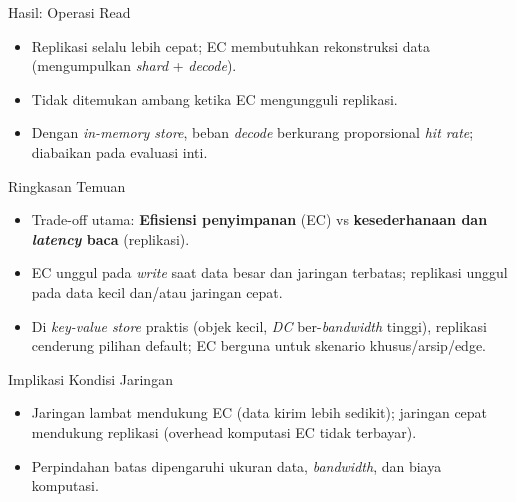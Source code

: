\documentclass[a2,portrait]{config/poster/a0poster}
\newcommand{\postersection}[1]{%
	\begin{tcolorbox}[
		colback=MainBlue,
		colframe=MainBlue,
		fonttitle=\bfseries,
		coltext=white,
		sharp corners,
		boxrule=0pt,
		top=0pt,
		bottom=0pt,
		halign=center
	]
	\normalsize #1
	\end{tcolorbox}%
}
\begin{document}
\begin{multicols}{2}

\postersection{Hasil: Operasi Read}
\begin{itemize}
	\item Replikasi selalu lebih cepat; EC membutuhkan rekonstruksi data (mengumpulkan \textit{shard} + \textit{decode}).
	\item Tidak ditemukan ambang ketika EC mengungguli replikasi.
	\item Dengan \textit{in-memory store}, beban \textit{decode} berkurang proporsional \textit{hit rate}; diabaikan pada evaluasi inti.
\end{itemize}


\postersection{Ringkasan Temuan}
\begin{itemize}
	\item Trade-off utama: \textbf{Efisiensi penyimpanan} (EC) vs \textbf{kesederhanaan dan \textit{latency} baca} (replikasi).
	\item EC unggul pada \textit{write} saat data besar dan jaringan terbatas; replikasi unggul pada data kecil dan/atau jaringan cepat.
	\item Di \textit{key-value store} praktis (objek kecil, \textit{DC} ber-\textit{bandwidth} tinggi), replikasi cenderung pilihan default; EC berguna untuk skenario khusus/arsip/edge.
\end{itemize}


\postersection{Implikasi Kondisi Jaringan}
\begin{itemize}
	\item Jaringan lambat mendukung EC (data kirim lebih sedikit); jaringan cepat mendukung replikasi (overhead komputasi EC tidak terbayar).
	\item Perpindahan batas dipengaruhi ukuran data, \textit{bandwidth}, dan biaya komputasi.
\end{itemize}



\end{multicols}
\end{document}
